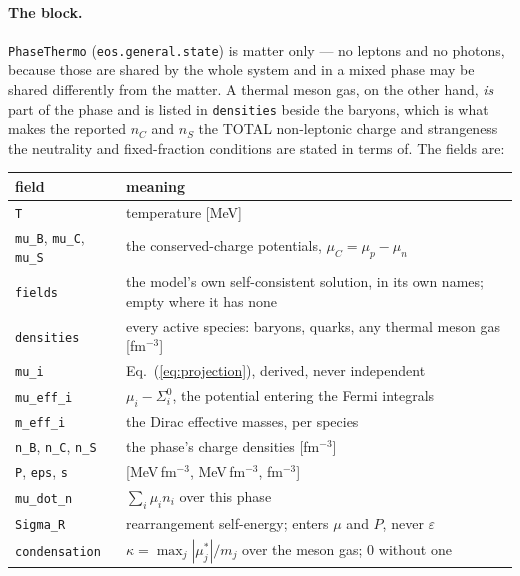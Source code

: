 \documentclass[aps,prc,onecolumn,superscriptaddress,nofootinbib,10pt]{revtex4-2}
\newcommand{\nC}{n_C}
\newcommand{\nS}{n_S}
\newcommand{\muC}{\mu_C}
\begin{document}
\paragraph{The block.} \texttt{PhaseThermo}
(\texttt{eos.general.state}) is matter only --- no leptons and no photons,
because those are shared by the whole system and in a mixed phase may be shared
differently from the matter. A thermal meson gas, on the other hand, \emph{is}
part of the phase and is listed in \texttt{densities} beside the baryons, which
is what makes the reported $\nC$ and $\nS$ the TOTAL non-leptonic charge and
strangeness the neutrality and fixed-fraction conditions are stated in terms
of. The fields are:

\begin{center}
\begin{tabular}{ll}
\toprule
field & meaning \\
\midrule
\texttt{T} & temperature [MeV] \\
\texttt{mu\_B}, \texttt{mu\_C}, \texttt{mu\_S}
  & the conserved-charge potentials, $\muC = \mu_p - \mu_n$ \\
\texttt{fields} & the model's own self-consistent solution, in its own names;
                  empty where it has none \\
\texttt{densities} & every active species: baryons, quarks, any thermal meson
                     gas [fm$^{-3}$] \\
\texttt{mu\_i} & Eq.~(\ref{eq:projection}), derived, never independent \\
\texttt{mu\_eff\_i} & $\mu_i - \Sigma^0_i$, the potential entering the Fermi
                      integrals \\
\texttt{m\_eff\_i} & the Dirac effective masses, per species \\
\texttt{n\_B}, \texttt{n\_C}, \texttt{n\_S} & the phase's charge densities
                                              [fm$^{-3}$] \\
\texttt{P}, \texttt{eps}, \texttt{s} & [MeV\,fm$^{-3}$, MeV\,fm$^{-3}$,
                                       fm$^{-3}$] \\
\texttt{mu\_dot\_n} & $\sum_i \mu_i n_i$ over this phase \\
\texttt{Sigma\_R} & rearrangement self-energy; enters $\mu$ and $P$, never
                    $\varepsilon$ \\
\texttt{condensation} & $\kappa = \max_j |\mu^{*}_j|/m_j$ over the meson gas;
                        $0$ without one \\
\bottomrule
\end{tabular}
\end{center}
\end{document}

